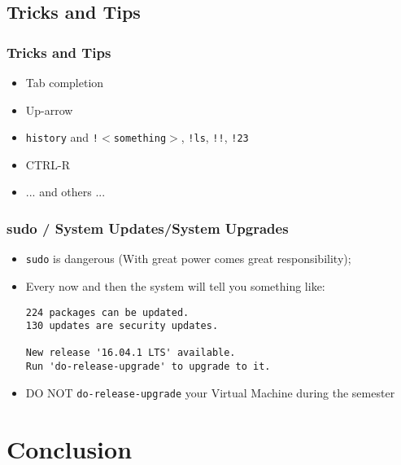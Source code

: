 \documentclass[utf8x,10pt]{beamer}
\begin{document}
\subsection{Tricks and Tips}
\begin{frame}
  \frametitle{Tricks and Tips}

  \begin{itemize}
  \item Tab completion
  \item Up-arrow
  \item \texttt{history} and \texttt{!$<$something$>$}, \texttt{!ls}, \texttt{!!}, \texttt{!23}
  \item CTRL-R
  \item ... and others ...
  \end{itemize}
\end{frame}

\begin{frame}[fragile]
  \frametitle{sudo / System Updates/System Upgrades}

  \begin{itemize}
  \item \texttt{sudo} is dangerous (With great power comes great responsibility);
  \item Every now and then the system will tell you something like:
{\scriptsize
\begin{verbatim}
224 packages can be updated.
130 updates are security updates.

New release '16.04.1 LTS' available.
Run 'do-release-upgrade' to upgrade to it.
\end{verbatim}
}
  \item DO NOT \texttt{do-release-upgrade} your Virtual Machine during the semester
  \end{itemize}
\end{frame}

\section{Conclusion}
\end{document}
